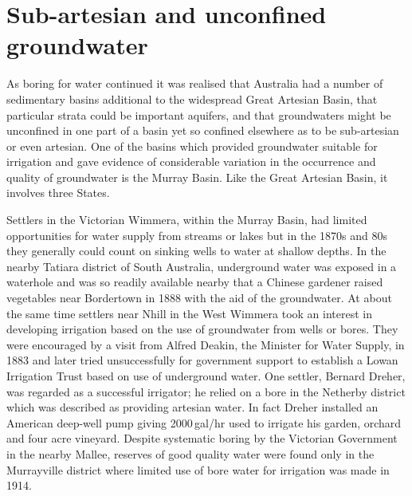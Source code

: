 \section*{Sub-artesian and unconfined groundwater}

As boring for water continued it was realised that Australia had a
number of sedimentary basins additional to the widespread Great
Artesian Basin, that particular strata could be important aquifers,
and that groundwaters might be unconfined in one part of a basin yet
so confined elsewhere as to be sub-artesian or even artesian.  One of
the basins which provided groundwater suitable for irrigation and gave
evidence of considerable variation in the occurrence and quality of
groundwater is the Murray Basin.  Like the Great Artesian Basin, it
involves three States.

Settlers in the Victorian Wimmera, within the Murray Basin, had
limited opportunities for water supply from streams or lakes but in
the 1870s and 80s they generally could count on sinking wells to water
at shallow depths.  In the nearby Tatiara district of South Australia,
underground water was exposed in a waterhole and was so readily
available nearby that a Chinese gardener raised vegetables near
Bordertown in 1888 with the aid of the groundwater. At about the same time settlers near Nhill in the West
Wimmera took an interest in developing irrigation based on the use of
groundwater from wells or bores.  They were encouraged by a visit from
Alfred Deakin, the Minister for Water Supply, in 1883 and later tried
unsuccessfully for government support to establish a Lowan Irrigation
Trust based on use of underground water.  One settler, Bernard Dreher, was regarded as a
successful irrigator; he relied on a bore in the Netherby district
which was described as providing artesian water.  In fact Dreher
installed an American deep-well pump giving 2000\,gal/hr used to
irrigate his garden, orchard and four acre vineyard.  Despite systematic boring by the Victorian Government
in the nearby Mallee, reserves of good quality water were found only
in the Murrayville district where limited use of bore water for
irrigation was made in 1914.

